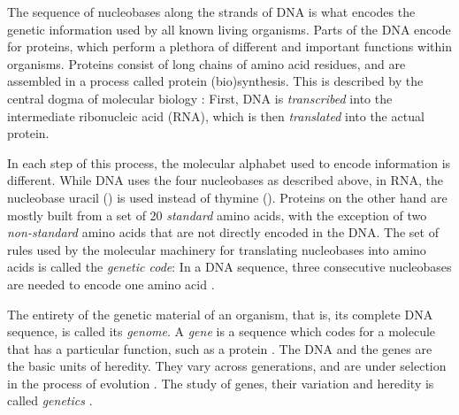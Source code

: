 
The sequence of nucleobases along the strands of DNA is what encodes the genetic information
used by all known living organisms.
Parts of the DNA encode for proteins,
which perform a plethora of different and important functions within organisms.
Proteins consist of long chains of amino acid residues, and
are assembled in a process called protein (bio)synthesis.
This is described by the central dogma of molecular biology \cite{Crick1958,Crick1970}:
First, DNA is \emph{transcribed} into the intermediate ribonucleic acid (RNA),
which is then \emph{translated} into the actual protein.

In each step of this process, the molecular alphabet used to encode information is different.
While DNA uses the four nucleobases as described above,
in RNA, the nucleobase uracil () is used instead of thymine ().
Proteins on the other hand are mostly built from a set of \num{20} \emph{standard} amino acids,
with the exception of two \emph{non-standard} amino acids that are not directly encoded in the DNA.
The set of rules used by the molecular machinery for translating nucleobases into amino acids
is called the \emph{genetic code}:
In a DNA sequence, three consecutive nucleobases are needed to encode one amino acid \cite{Shu2017}.

The entirety of the genetic material of an organism, that is, its complete DNA sequence, is called its \emph{genome}.
A \emph{gene} is a sequence which codes for a molecule that has a particular function, such as a protein \cite{Gericke2007}.
The DNA and the genes are the basic units of heredity.
They vary across generations, and are under selection in the process of evolution \cite{Dawkins1989}.
The study of genes, their variation and heredity is called \emph{genetics} \cite{Griffiths2000}.


